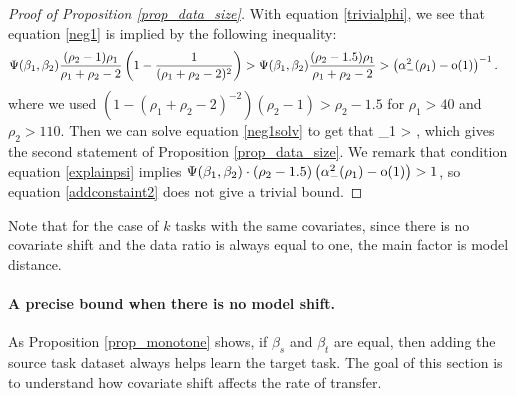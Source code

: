 \begin{proof}[Proof of Proposition \ref{prop_data_size}]
With equation \eqref{trivialphi}, we see that equation \eqref{neg1} is implied by the following inequality:
\begin{align}\label{neg1solv}
 & \Psi(\beta_1,\beta_2)  \frac{(\rho_2-1) \rho_1 }{\rho_1+\rho_2-2}\left( 1-\frac{1}{(\rho_1+\rho_2-2)^2}\right) >  \Psi(\beta_1,\beta_2) \frac{(\rho_2-1.5) \rho_1 }{\rho_1+\rho_2-2}> \left( \alpha_-^2(\rho_1) -  \operatorname{o}(1) \right)^{-1} .
 \end{align}
 where we used $(1-(\rho_1+\rho_2-2)^{-2})(\rho_2 - 1) > \rho_2-1.5$ for $\rho_1>40$ and $\rho_2>110$. Then we can solve equation \eqref{neg1solv} to get that
 \be\label{addconstaint2}
 \rho_1 >   ,
 \ee
which gives the second statement of Proposition \ref{prop_data_size}.
We remark that condition equation \eqref{explainpsi} implies $\Psi(\beta_1, \beta_2) \cdot  (\rho_2 - 1.5)\left( \alpha_-^2(\rho_1) -  \operatorname{o}(1) \right)>1$, so equation \eqref{addconstaint2} does not give a trivial bound. 
 \end{proof}
 






\iffalse
Note that for the case of $k$ tasks with the same covariates, since there is no covariate shift and the data ratio is always equal to one, the main factor is model distance.

\paragraph{A precise bound when there is no model shift.}
As Proposition \ref{prop_monotone} shows, if $\beta_s$ and $\beta_t$ are equal, then adding the source task dataset always helps learn the target task.
The goal of this section is to understand how covariate shift affects the rate of transfer. 


